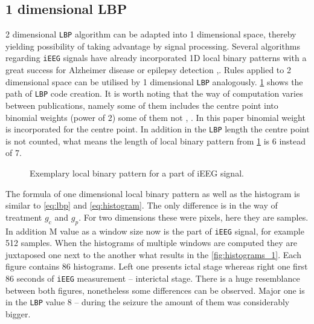 \subsection{1 dimensional LBP}
2 dimensional \verb|LBP| algorithm can be adapted into 1 dimensional space, thereby yielding possibility of taking advantage by signal processing. Several algorithms regarding \verb|iEEG| signals have already incorporated 1D local binary patterns with a great success for Alzheimer disease \cite{alzheimer} or epilepsy detection \cite{epilepsy_short},\cite{laelaps_long}. Rules applied to 2 dimensional space can be utilised by 1 dimensional \verb|LBP| analogously. \figurename{} \ref{fig:LBP_1_D} shows the path of \verb|LBP| code creation. It is worth noting that the way of computation varies between publications, namely some of them includes the centre point into binomial weights (power of 2) some of them not \cite{alzheimer}, \cite{lbp}. In this paper binomial weight is incorporated for the centre point. In addition in the \verb|LBP| length the centre point is not counted, what means the length of local binary pattern from \figurename{} \ref{fig:LBP_1_D} is 6 instead of 7.

\begin{figure}[H]
	\begin{center}
	\end{center}
	\caption{Exemplary local binary pattern for a part of iEEG signal.}

	\label{fig:LBP_1_D}
\end{figure}

The formula of one dimensional local binary pattern as well as the histogram is similar to \ref{eq:lbp} and \ref{eq:histogram}. The only difference is in the way of treatment $g_\mathrm{c}$ and $g_p$. For two dimensions these were pixels, here they are samples. In addition $\mathrm{M}$ value as a window size now is the part of \verb|iEEG| signal, for example 512 samples. When the histograms of multiple windows are computed they are juxtaposed one next to the another what results in the \figurename{} \ref{fig:histograms_1}. Each figure contains 86 histograms. Left one presents ictal stage whereas right one first 86 seconds of \verb|iEEG| measurement -- interictal stage. There is a huge resemblance between both figures, nonetheless some differences can be observed. Major one is in the \verb|LBP| value 8 -- during the seizure the amount of them was considerably bigger.

